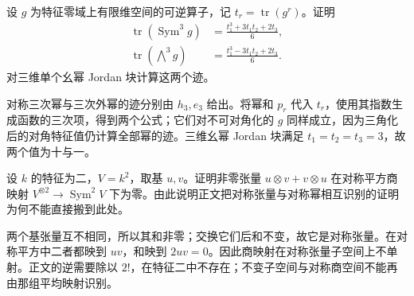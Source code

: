 \begin{exercise}\label{b5:ex:07-trace-cubic}
	设 \(g\) 为特征零域上有限维空间的可逆算子，记 \(t_r=\operatorname{tr}(g^r)\)。证明
	\begin{align*}
		\operatorname{tr}(\operatorname{Sym}^3g) &=\frac{t_1^3+3t_1t_2+2t_3}{6},\\
		\operatorname{tr}(\bigwedge^3g) &=\frac{t_1^3-3t_1t_2+2t_3}{6}.
	\end{align*}
	对三维单个幺幂 Jordan 块计算这两个迹。
\end{exercise}
\begin{solution}
	对称三次幂与三次外幂的迹分别由 \(h_3,e_3\) 给出。将幂和 \(p_r\) 代入 \(t_r\)，使用其指数生成函数的三次项，得到两个公式；它们对不可对角化的 \(g\) 同样成立，因为三角化后的对角特征值仍计算全部幂的迹。三维幺幂 Jordan 块满足 \(t_1=t_2=t_3=3\)，故两个值为十与一。
\end{solution}

\begin{exercise}\label{b5:ex:07-modular-obstruction}
	设 \(k\) 的特征为二，\(V=k^2\)，取基 \(u,v\)。证明非零张量 \(u\otimes v+v\otimes u\) 在对称平方商映射 \(V^{\otimes2}\to\operatorname{Sym}^2V\) 下为零。由此说明正文把对称张量与对称幂相互识别的证明为何不能直接搬到此处。
\end{exercise}
\begin{solution}
	两个基张量互不相同，所以其和非零；交换它们后和不变，故它是对称张量。在对称平方中二者都映到 \(uv\)，和映到 \(2uv=0\)。因此商映射在对称张量子空间上不单射。正文的逆需要除以 \(2!\)，在特征二中不存在；不变子空间与对称商空间不能再由那组平均映射识别。
\end{solution}
